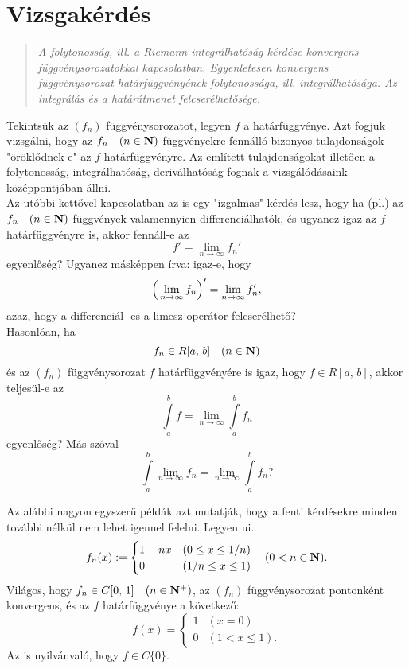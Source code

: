 \newpage
\section{Vizsgakérdés}
\begin{quote}
	\textit{A folytonosság, ill. a Riemann-integrálhatóság kérdése konvergens függvénysorozatokkal kapcsolatban. Egyenletesen konvergens függvénysorozat határfüggvényének folytonossága, ill. integrálhatósága. Az integrálás és a határátmenet felcserélhetősége.}
\end{quote}

Tekintsük az $(f_n)$ függvénysorozatot, legyen $f$ a határfüggvénye. Azt fogjuk vizsgálni, hogy az $f_n \quad (n \in \mathbf{N})$ függvényekre fennálló bizonyos tulajdonságok "öröklődnek-e" az $f$ határfüggvényre. Az említett tulajdonságokat illetően a folytonosság, integrálhatóság, deriválhatóság fognak a vizsgálódásaink középpontjában állni.\\

Az utóbbi kettővel kapcsolatban az is egy "izgalmas" kérdés lesz, hogy ha (pl.) az $f_n \quad (n \in \mathbf{N})$ függvények valamennyien differenciálhatók, és ugyanez igaz az $f$ határfüggvényre is, akkor fennáll-e az
\[
	f' = \lim_{n \to \infty} f_n'
\]
egyenlőség? Ugyanez másképpen írva: igaz-e, hogy
\[
	\Big(  \lim_{n \to \infty} f_n  \Big)' = \lim_{n \to \infty} f'_n,
\]
azaz, hogy a differenciál- es a limesz-operátor felcserélhető?\\

Hasonlóan, ha
\[
	f_n \in R[a, \, b] \quad (n \in \mathbf{N})
\]
és az $(f_n)$ függvénysorozat $f$ határfüggvényére is igaz, hogy $f \in R[a, \, b]$, akkor teljesül-e az
\[
	\int\limits_a^b f = \lim_{n \to \infty} \int\limits_a^b f_n
\]
egyenlőség? Más szóval
\[
	\int\limits_a^b \lim_{n \to \infty} f_n = \lim_{n \to \infty} \int\limits_a^b f_n?
\]

Az alábbi nagyon egyszerű példák azt mutatják, hogy a fenti kérdésekre minden további nélkül nem lehet igennel felelni. Legyen ui.
\[
	f_n(x) := \begin{cases}
		1 - nx & (0 \leq x \leq 1/n)\\
		0 & (1/n \leq x \leq 1) 
	\end{cases} \quad (0 < n \in \mathbf{N}).
\]
Világos, hogy $f_n \in C[0, \, 1] \quad (n \in \mathbf{N}^+)$, az $(f_n)$ függvénysorozat pontonként konvergens, és az $f$ határfüggvénye a következő:
\[
	f(x) = \begin{cases}
		1 & (x = 0) \\
		0 & (1 < x \leq 1).
	\end{cases}
\]
Az is nyilvánvaló, hogy $f \in C\{0\}$.\\

